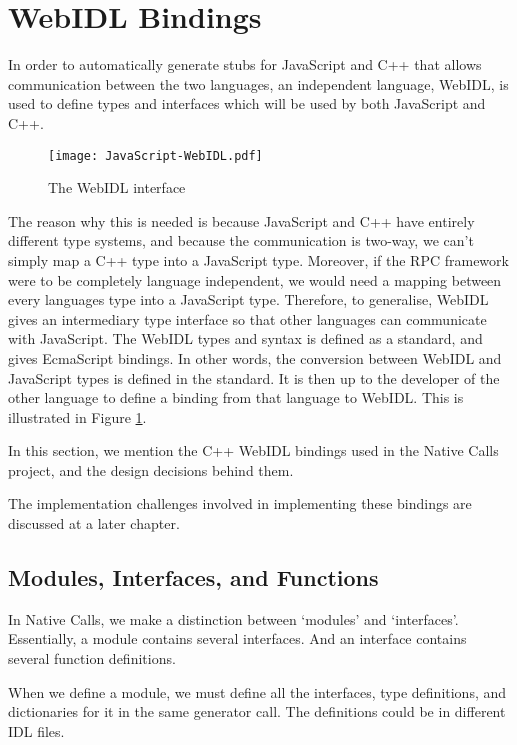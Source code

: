 \section{WebIDL Bindings} %
\label{sec:webidl_bindings}

In order to automatically generate stubs for JavaScript and C++ that allows communication between the two languages, an independent language, WebIDL, is used to define types and interfaces which will be used by both JavaScript and C++.

\begin{figure}
    \centering
    \texttt{[image: JavaScript-WebIDL.pdf]} 
    \caption{The WebIDL interface}
    \label{fig:webidl_intreface}
\end{figure}

The reason why this is needed is because JavaScript and C++ have entirely different type systems, and because the communication is two-way, we can't simply map a C++ type into a JavaScript type. Moreover, if the RPC framework were to be completely language independent, we would need a mapping between every languages type into a JavaScript type. Therefore, to generalise, WebIDL gives an intermediary type interface so that other languages can communicate with JavaScript. The WebIDL types and syntax is defined as a standard, and gives EcmaScript bindings. In other words, the conversion between WebIDL and JavaScript types is defined in the standard. It is then up to the developer of the other language to define a binding from that language to WebIDL. This is illustrated in Figure \ref{fig:webidl_intreface}.

In this section, we mention the C++ WebIDL bindings used in the Native Calls project, and the design decisions behind them.

The implementation challenges involved in implementing these bindings are discussed at a later chapter.

\subsection{Modules, Interfaces, and Functions} %
\label{sub:modules_and_interfaces}
In Native Calls, we make a distinction between `modules' and `interfaces'. Essentially, a module contains several interfaces. And an interface contains several function definitions.

When we define a module, we must define all the interfaces, type definitions, and dictionaries for it in the same generator call. The definitions could be in different IDL files.


